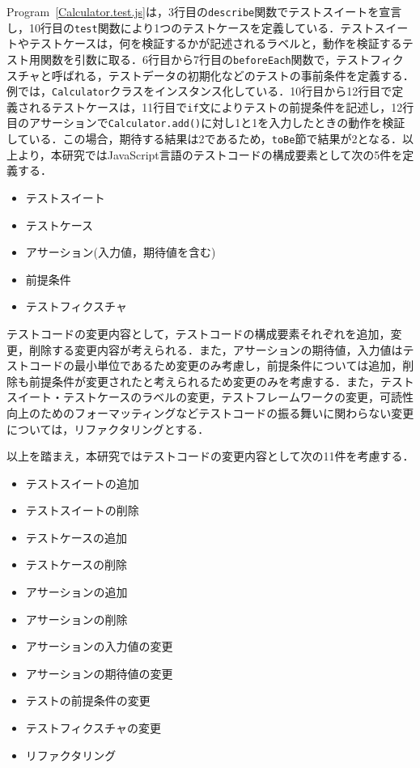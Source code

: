 \documentclass[11pt,dvipdfmx]{jreport}
\begin{document}
Program~\ref{Calculator.test.js}は，3行目の{\verb|describe|}関数でテストスイートを宣言し，10行目の{\verb|test|}関数により1つのテストケースを定義している．テストスイートやテストケースは，何を検証するかが記述されるラベルと，動作を検証するテスト用関数を引数に取る．6行目から7行目の{\verb|beforeEach|}関数で，テストフィクスチャと呼ばれる，テストデータの初期化などのテストの事前条件を定義する．例では，{\verb|Calculator|}クラスをインスタンス化している．10行目から12行目で定義されるテストケースは，11行目で{\verb|if|}文によりテストの前提条件を記述し，12行目のアサーションで{\verb|Calculator.add()|}に対し1と1を入力したときの動作を検証している．この場合，期待する結果は2であるため，{\verb|toBe|}節で結果が2となる．以上より，本研究ではJavaScript言語のテストコードの構成要素として次の5件を定義する．

\begin{itemize}
  \setlength{\itemsep}{0cm}
  \item テストスイート
  \item テストケース
  \item アサーション(入力値，期待値を含む)
  \item 前提条件
  \item テストフィクスチャ
\end{itemize}

テストコードの変更内容として，テストコードの構成要素それぞれを追加，変更，削除する変更内容が考えられる．また，アサーションの期待値，入力値はテストコードの最小単位であるため変更のみ考慮し，前提条件については追加，削除も前提条件が変更されたと考えられるため変更のみを考慮する．また，テストスイート・テストケースのラベルの変更，テストフレームワークの変更，可読性向上のためのフォーマッティングなどテストコードの振る舞いに関わらない変更については，リファクタリングとする．

以上を踏まえ，本研究ではテストコードの変更内容として次の11件を考慮する．

\begin{itemize}
  \setlength{\itemsep}{0cm}
  \item テストスイートの追加
  \item テストスイートの削除
  \item テストケースの追加
  \item テストケースの削除
  \item アサーションの追加
  \item アサーションの削除
  \item アサーションの入力値の変更
  \item アサーションの期待値の変更
  \item テストの前提条件の変更
  \item テストフィクスチャの変更
  \item リファクタリング
\end{itemize}
\end{document}
